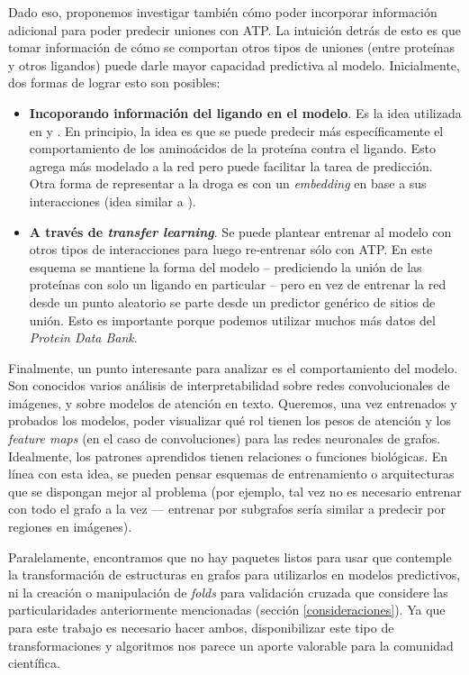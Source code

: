 \documentclass[
    left=2.0cm,         %
    right=2.0cm,        %
    top=2.0cm,          %
    bottom=2.5cm,         %
    bindingoffset=6mm,  %
    nohyphenation=false %
]{eiti/eiti-thesis}
\begin{document}
Dado eso, proponemos investigar también cómo poder incorporar información adicional
para poder predecir uniones con ATP. La intuición detrás de esto es que tomar información
de cómo se comportan otros tipos de uniones (entre proteínas y otros ligandos) puede darle
mayor capacidad predictiva al modelo. Inicialmente, dos formas de lograr esto son posibles:   

\begin{itemize}
    \item \textbf{Incoporando información del ligando en el modelo}. Es la idea utilizada en
    \cite{tsubaki2018CPIgnn} y \cite{yang2013tmsite}. En principio, la idea es que se puede
    predecir más específicamente el comportamiento de los aminoácidos de la proteína
    contra el ligando. Esto agrega más modelado a la red pero puede facilitar la tarea de
    predicción. Otra forma de representar a la droga es
    con un \textit{embedding} en base a sus interacciones (idea similar a 
    \cite{keiser2009newtargetsknowndrugs}).
    \item \textbf{A través de \textit{transfer learning}}. Se puede plantear entrenar
    al modelo con otros tipos de interacciones para luego re-entrenar sólo con ATP.
    En este esquema se mantiene la forma del modelo -- prediciendo la unión de las proteínas con solo un ligando en particular -- pero en vez de entrenar la red desde un punto aleatorio se 
    parte desde un predictor genérico de sitios de unión. Esto es importante porque
    podemos utilizar muchos más datos del \textit{Protein Data Bank}. 
\end{itemize}

Finalmente, un punto interesante para analizar es el comportamiento del modelo. Son conocidos
varios análisis de interpretabilidad sobre redes convolucionales de 
imágenes\cite{olah2018interpretability}, y sobre
modelos de atención en texto\cite{attentionalyouneed}. Queremos, una vez entrenados
y probados los modelos,
poder visualizar qué rol tienen los pesos de atención y los \textit{feature maps} (en el caso
de convoluciones) para las redes neuronales de grafos. Idealmente, los patrones aprendidos
tienen relaciones o funciones biológicas. En línea con esta idea,
se pueden pensar esquemas de entrenamiento o arquitecturas que
se dispongan mejor al problema (por ejemplo, tal vez no es necesario entrenar con todo el grafo a la vez --- entrenar por subgrafos sería similar a predecir por regiones en imágenes).

Paralelamente, encontramos que no hay paquetes listos para usar que contemple la
transformación de estructuras en grafos para utilizarlos en modelos predictivos, ni
la creación o manipulación de \textit{folds} para validación cruzada que considere 
las particularidades anteriormente mencionadas (sección \ref{consideraciones}). Ya que
para este trabajo es necesario hacer ambos, disponibilizar este tipo de transformaciones
y algoritmos nos parece un aporte valorable para la comunidad científica.
\end{document}
